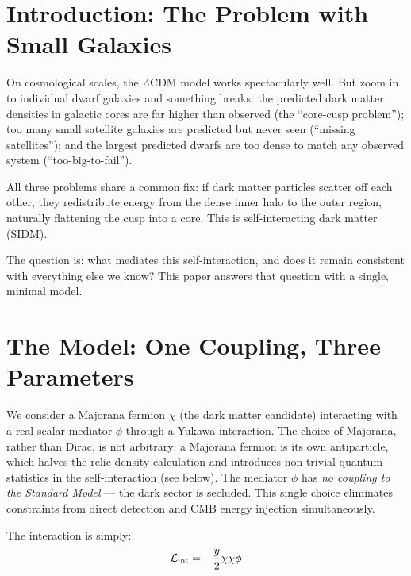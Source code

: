 
\section{Introduction: The Problem with Small Galaxies}
\label{ch1:intro}

On cosmological scales, the $\Lambda$CDM model works spectacularly well.
But zoom in to individual dwarf galaxies and something breaks: the predicted
dark matter densities in galactic cores are far higher than observed
(the ``core-cusp problem''); too many small satellite galaxies are predicted
but never seen (``missing satellites''); and the largest predicted dwarfs
are too dense to match any observed system (``too-big-to-fail'').

All three problems share a common fix: if dark matter particles scatter
off each other, they redistribute energy from the dense inner halo to
the outer region, naturally flattening the cusp into a core. This is
self-interacting dark matter (SIDM).

The question is: what mediates this self-interaction, and does it remain
consistent with everything else we know? This paper answers that question
with a single, minimal model.

\section{The Model: One Coupling, Three Parameters}
\label{ch1:model}

We consider a Majorana fermion $\chi$ (the dark matter candidate) interacting
with a real scalar mediator $\phi$ through a Yukawa interaction. The choice
of Majorana, rather than Dirac, is not arbitrary: a Majorana fermion is its
own antiparticle, which halves the relic density calculation and introduces
non-trivial quantum statistics in the self-interaction (see below).
The mediator $\phi$ has \emph{no coupling to the Standard Model} — the dark
sector is secluded. This single choice eliminates constraints from direct
detection and CMB energy injection simultaneously.

The interaction is simply:
\begin{equation}
  \mathcal{L}_{\rm int} = -\frac{y}{2}\bar{\chi}\chi\phi
\end{equation}

